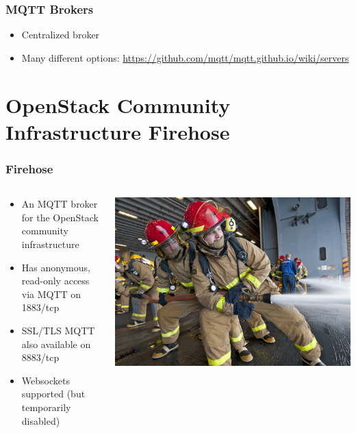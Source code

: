 \documentclass[aspectratio=169,11pt,hyperref={colorlinks=true}]{beamer}
\begin{document}
\begin{frame}
    \frametitle{MQTT Brokers}
    \begin{itemize}
        \item Centralized broker
        \item Many different options: \href{https://github.com/mqtt/mqtt.github.io/wiki/servers}{https://github.com/mqtt/mqtt.github.io/wiki/servers}
     \end{itemize}
\end{frame}

\section{OpenStack Community Infrastructure Firehose}
\begin{frame}
	\frametitle{Firehose}
    \begin{columns}[T]
        \begin{column}{.48\textwidth}
            \begin{itemize}
                \item An MQTT broker for the OpenStack community infrastructure
                \item Has anonymous, read-only access via MQTT on 1883/tcp
                \item SSL/TLS MQTT also available on 8883/tcp
                \item Websockets supported (but temporarily disabled)
            \end{itemize}
        \end{column}
        \begin{column}{.48\textwidth}
            \includegraphics[width=\textwidth]{firehose.jpg}
        \end{column}
    \end{columns}
\end{frame}
\end{document}
